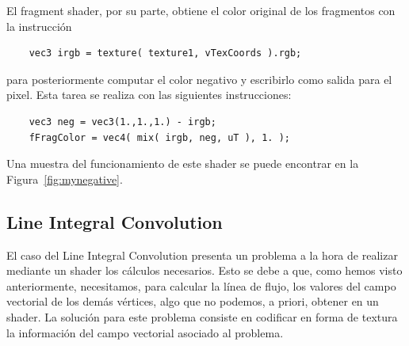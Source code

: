 El fragment shader, por su parte, obtiene el color original de los fragmentos
con la instrucción

\begin{verbatim}
    vec3 irgb = texture( texture1, vTexCoords ).rgb;
\end{verbatim}

para posteriormente computar el color negativo y escribirlo como salida para el
pixel. Esta tarea se realiza con las siguientes instrucciones:

\begin{verbatim}
    vec3 neg = vec3(1.,1.,1.) - irgb;
    fFragColor = vec4( mix( irgb, neg, uT ), 1. );
\end{verbatim}

Una muestra del funcionamiento de este shader se puede encontrar en la
Figura~\ref{fig:mynegative}.

% 

\subsection{Line Integral Convolution}
\label{makereference5.5.8}

El caso del Line Integral Convolution presenta un problema a la hora de realizar
mediante un shader los cálculos necesarios. Esto se debe a que, como hemos visto
anteriormente, necesitamos, para calcular la línea de flujo, los valores del
campo vectorial de los demás vértices, algo que no podemos, a priori, obtener en
un shader. La solución para este problema consiste en codificar en forma de
textura la información del campo vectorial asociado al problema. 

